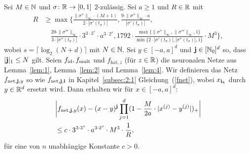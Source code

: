 {\begin{lem}
\label{lem:5}
Sei $M \in \mathbb{N}$ und $\sigma\colon \mathbb{R} \to [0, 1]$ $2$-zulässig.
Sei $a \geq 1$ und $R \in \mathbb{R}$ mit
\begin{equation*}
\begin{split}
R & \geq \max\biggl\{\frac{\|\sigma''\|_{\infty} \cdot (M + 1)}{2 \cdot |\sigma'(t_{\sigma})|}, \frac{9 \cdot \|\sigma''\|_{\infty} \cdot a}{|\sigma'(t_{\sigma})|}, \\
& \quad \frac{20 \cdot \|\sigma'''\|_{\infty}}{3 \cdot |\sigma''(t_{\sigma})|} \cdot 3^{3 \cdot 3^s} \cdot a^{3 \cdot 2^s}, 1792 \cdot \frac{\max\{\|\sigma''\|_{\infty},\|\sigma'''\|_{\infty}, 1\}}{\min\{2 \cdot |\sigma'(t_{\sigma})|, |\sigma''(t_{\sigma})|, 1\}} \cdot M^3 \biggr\},
\end{split}
\end{equation*}
wobei $s = \lceil\log_2(N + d)\rceil$ mit $N \in \mathbb{N}$. Sei $y \in [-a, a]^d$ und $\mathbf{j} \in [\mathbb{N}_0]^d$ so, dass $|\mathbf{j}|_1 \leq N$ gilt. Seien $f_{\mathrm{id}}, f_{\mathrm{mult}}$ und $f_{\mathrm{hat}, z}$ (für $z \in \mathbb{R}$) die neuronalen Netze aus Lemma~\ref{lem:1}, Lemma~\ref{lem:2} und Lemma~\ref{lem:4}. Wir definieren das Netz $f_{\mathrm{net},\mathbf{j},y}$ so wie $f_{\mathrm{net},\mathbf{j},\mathbf{i}}$ in Kapitel~\ref{subsec:2:1} Gleichung~(\ref{fnet}), wobei $x_{{\mathbf{i}}_k}$ durch $y \in \mathbb{R}^d$ ersetzt wird.
Dann erhalten wir für $x \in [-a, a]^d$:
\begin{equation*}
\begin{split}
& \bigg|f_{\mathrm{net},\mathbf{j},y}(x) - (x - y)^{\mathbf{j}} \prod_{j = 1}^d (1 - \frac{M}{2a} \cdot |x^{(j)} - y^{(j)}|)_+\bigg| \\
& \leq c \cdot 3^{3 \cdot 3^s} \cdot a^{3 \cdot 2^s} \cdot M^3 \cdot \frac{1}{R},
\end{split}
\end{equation*}
für eine von $n$ unabhängige Konstante $c > 0$.
\end{lem}

}
